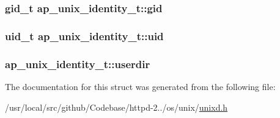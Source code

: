 \subsubsection[{\texorpdfstring{gid}{gid}}]{\setlength{\rightskip}{0pt plus 5cm}gid\+\_\+t ap\+\_\+unix\+\_\+identity\+\_\+t\+::gid}\hypertarget{structap__unix__identity__t_ac9d744a0881d60fd6161412fe6e9f914}{}\label{structap__unix__identity__t_ac9d744a0881d60fd6161412fe6e9f914}
\subsubsection[{\texorpdfstring{uid}{uid}}]{\setlength{\rightskip}{0pt plus 5cm}uid\+\_\+t ap\+\_\+unix\+\_\+identity\+\_\+t\+::uid}\hypertarget{structap__unix__identity__t_a2fe615ce1c1aebd146fe018793be5d71}{}\label{structap__unix__identity__t_a2fe615ce1c1aebd146fe018793be5d71}
\subsubsection[{\texorpdfstring{userdir}{userdir}}]{ ap\+\_\+unix\+\_\+identity\+\_\+t\+::userdir}\hypertarget{structap__unix__identity__t_ac206549468b554b578a2cc047322b25e}{}\label{structap__unix__identity__t_ac206549468b554b578a2cc047322b25e}


The documentation for this struct was generated from the following file\+:\begin{DoxyCompactItemize}
\item 
/usr/local/src/github/\+Codebase/httpd-\/2../os/unix/\hyperlink{unixd_8h}{unixd.\+h}\end{DoxyCompactItemize}
